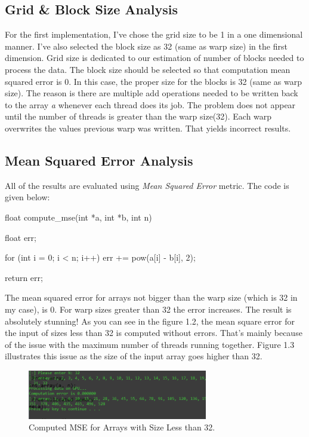 \documentclass[12pt]{article}
\numberwithin{equation}{section}
\numberwithin{table}{section}
\numberwithin{figure}{section}
\begin{document}
\subsection{Grid \& Block Size Analysis}
For the first implementation, I've chose the grid size to be 1 in a one dimensional manner. I've also selected the block size as 32 (same as warp size) in the first dimension. Grid size is dedicated to our estimation of number of blocks needed to process the data. The block size should be selected so that computation mean squared error is 0. In this case, the proper size for the blocks is 32 (same as warp size). The reason is there are multiple add operations needed to be written back to the array \textit{a} whenever each thread does its job. The problem does not appear until the number of threads is greater than the warp size(32). Each warp overwrites the values previous warp was written. That yields incorrect results.
\subsection{Mean Squared Error Analysis}
All of the results are evaluated using \textit{Mean Squared Error} metric. The code is given below:
\begin{cpp}
	float compute_mse(int *a, int *b, int n) {
		float err;
		
		for (int i = 0; i < n; i++) {
			err += pow(a[i] - b[i], 2);
		}
		
		return err;
	}
\end{cpp}
The mean squared error for arrays not bigger than the warp size (which is 32 in my case), is 0. For warp sizes greater than 32 the error increases. The result is absolutely stunning! As you can see in the figure 1.2, the mean square error for the input of sizes less than 32 is computed without errors. That's mainly because of the issue with the maximum number of threads running together. Figure 1.3 illustrates this issue as the size of the input array goes higher than 32.

\begin{figure}[!h]\centering
	\includegraphics[width=0.7\textwidth]{1_2.png}
	\caption{Computed MSE for Arrays with Size Less than 32.}
	\label{pl1}
\end{figure}
\end{document}
